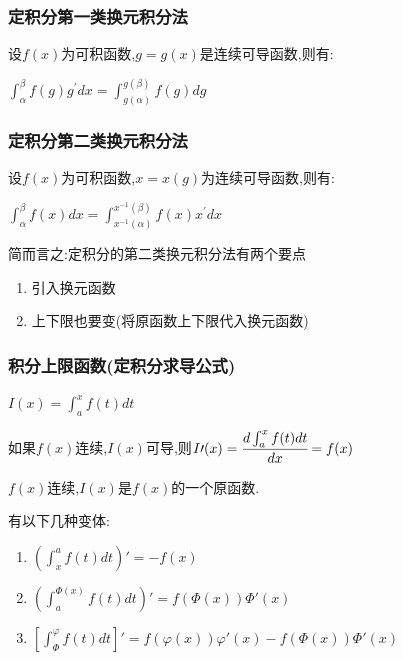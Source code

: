 \documentclass[UTF8,12pt]{ctexbook}
\newcommand{\derivative}{^\prime}
\newcommand{\defFunction}[1]{f(#1)}
\newcommand{\definiteIntegral}[2]{\int^{#1}_{#2}}
\begin{document}
{{{\subsubsection{定积分第一类换元积分法}{
  设$\defFunction{x}$为可积函数,$g = g(x)$是连续可导函数,则有:

  $\definiteIntegral{\beta}{\alpha} \defFunction{g}g\derivative dx = \definiteIntegral{g(\beta)}{g(\alpha)} \defFunction{g}dg$
}%

\subsubsection{定积分第二类换元积分法}{
  设$\defFunction{x}$为可积函数,$x = x(g)$为连续可导函数,则有:

  $\definiteIntegral{\beta}{\alpha} \defFunction{x}dx = \definiteIntegral{x^{-1}(\beta)}{x^{-1}(\alpha)}\defFunction{x}x\derivative dx$

  简而言之:定积分的第二类换元积分法有两个要点
  \begin{enumerate}
    \item 引入换元函数
    \item 上下限也要变(将原函数上下限代入换元函数)
  \end{enumerate}
}%

\subsubsection{积分上限函数(定积分求导公式)}{
  $I(x) = \definiteIntegral{x}{a}\defFunction{t}dt$

  如果$\defFunction{x}连续$,$I(x)$可导,则$I\prime(x) = \cfrac{d\definiteIntegral{x}{a}f(t)dt}{dx} = f(x)$

  $\defFunction{x}$连续,$I(x)$是$f(x)$的一个原函数.

  有以下几种变体:

  \begin{enumerate}
    \item $(\definiteIntegral{a}{x}\defFunction{t}dt)\prime = -\defFunction{x}$
    \item $(\definiteIntegral{\Phi(x)}{a}\defFunction{t}dt)\prime = \defFunction{\Phi(x)}\Phi\prime(x)$
    \item $[\definiteIntegral{\varphi}{\Phi}\defFunction{t}dt]\prime = \defFunction{\varphi(x)}\varphi\prime(x) - \defFunction{\Phi(x)}\Phi\prime(x)$
  \end{enumerate}

}%

}}}
\end{document}
